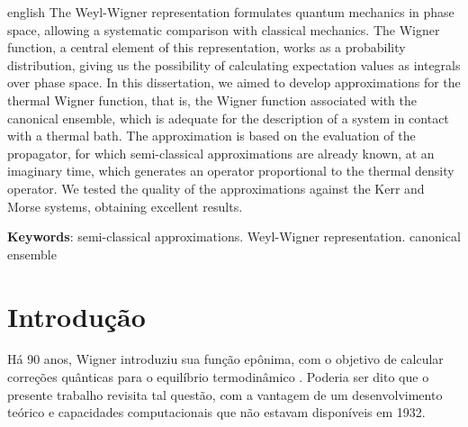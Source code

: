 \documentclass[
	12pt,
	oneside,			%
	a4paper,			%
	english,			%
	brazil				%
	]{abntex2}
\theoremstyle{definition}
\begin{document}
\begin{resumo}[Abstract]
 \begin{otherlanguage*}{english}
   The Weyl-Wigner representation formulates quantum mechanics in phase space, allowing a systematic comparison with classical mechanics. The Wigner function, a central element of this representation, works as a probability distribution, giving us the possibility of calculating expectation values as integrals over phase space. In this dissertation, we aimed to develop approximations for the thermal Wigner function, that is, the Wigner function associated with the canonical ensemble, which is adequate for the description of a system in contact with a thermal bath. The approximation is based on the evaluation of the propagator, for which semi-classical approximations are already known, at an imaginary time, which generates an operator proportional to the thermal density operator. We tested the quality of the approximations against the Kerr and Morse systems, obtaining excellent results.

   \vspace{\onelineskip}
 
   \noindent 
   \textbf{Keywords}: semi-classical approximations. Weyl-Wigner representation. canonical ensemble
 \end{otherlanguage*}
\end{resumo}

\tableofcontents*
\cleardoublepage



\textual

\chapter{Introdução}

Há 90 anos, Wigner introduziu sua função epônima, com o objetivo de calcular correções quânticas para o equilíbrio termodinâmico \cite{PhysRev.40.749}. Poderia ser dito que o presente trabalho revisita tal questão, com a vantagem de um desenvolvimento teórico e capacidades computacionais que não estavam disponíveis em 1932. 
\end{document}
